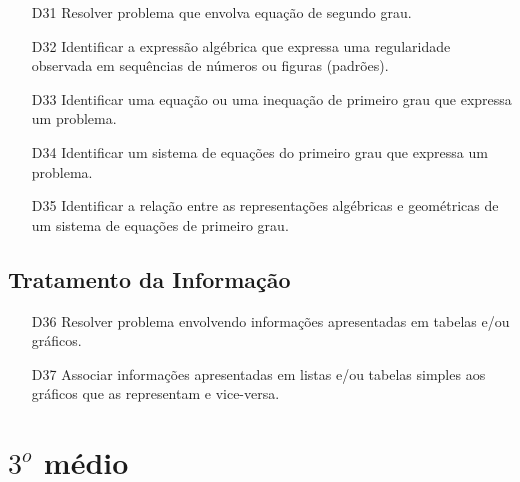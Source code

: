\begin{enumerate}
    \item[D31] \label{itm9:D31} Resolver problema que envolva equação de segundo grau.
    \item[D32] \label{itm9:D32} Identificar a expressão algébrica que expressa uma regularidade observada em sequências de números ou figuras (padrões).
    \item[D33] \label{itm9:D33} Identificar uma equação ou uma inequação de primeiro grau que expressa um problema.
    \item[D34] \label{itm9:D34} Identificar um sistema de equações do primeiro grau que expressa um problema. 
    \item[D35] \label{itm9:D35} Identificar a relação entre as representações algébricas e geométricas de um sistema de equações de primeiro grau.
\end{enumerate}

\subsection{Tratamento da Informação}
\begin{enumerate}
    \item[D36] \label{itm9:D36} Resolver problema envolvendo informações apresentadas em tabelas e/ou gráficos.
    \item[D37] \label{itm9:D37} Associar informações apresentadas em listas e/ou tabelas simples aos gráficos que as representam e vice-versa.
\end{enumerate}


\section{$3^o$ médio}

